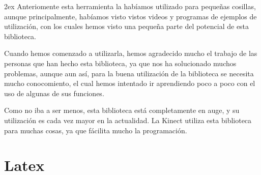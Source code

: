 \documentclass[12pt,a4paper]{report}
\begin{document}
\parskip 2ex
Anteriomente esta herramienta la habíamos utilizado para pequeñas cosillas,
aunque principalmente, habíamos visto vistos videos y programas de ejemplos de
utilización, con los cuales hemos visto una pequeña parte del potencial de esta
biblioteca. 

Cuando hemos comenzado a utilizarla, hemos agradecido mucho el trabajo de las
personas que han hecho esta biblioteca, ya que nos ha solucionado muchos
problemas, aunque aun así, para la buena utilización de la biblioteca se
necesita mucho conocomiento, el cual hemos intentado ir aprendiendo poco a poco
con el uso de algunas de sus funciones.

Como no iba a ser menos, esta biblioteca está completamente en auge, y su
utilización es cada vez mayor en la actualidad. La Kinect utiliza esta
biblioteca para muchas cosas, ya que fácilita mucho la programación. 

\chapter{Latex}
\end{document}
